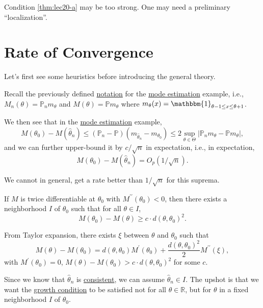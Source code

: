 \begin{remark}
	Condition \autoref{thm:lec20-a} may be too strong. One may need a preliminary ``localization''.
\end{remark}

\section{Rate of Convergence}
Let's first see some heuristics before introducing the general theory.

\begin{prev}
	Recall the previously defined \hyperref[not:M-estimation]{notation} for the \hyperref[eg:mode-estimation]{mode estimation} example, i.e., \(M_n(\theta ) = \mathbb{P} _n m_\theta \) and \(M(\theta ) = \mathbb{P} m_\theta \) where \(m_\theta (x) = \mathbbm{1}_{\theta -1 \leq x \leq \theta +1} \).
\end{prev}

We then see that in the \hyperref[eg:mode-estimation]{mode estimation} example,
\[
	M(\theta _0) - M(\hat{\theta} _n)
	\leq (\mathbb{P} _n - \mathbb{P} ) (m_{\hat{\theta } _n } - m_{\theta _0})
	\leq 2 \sup _{\theta \in \Theta } \vert \mathbb{P} _n m_\theta - \mathbb{P} m_\theta \vert,
\]
and we can further upper-bound it by \(c / \sqrt{n} \) in expectation, i.e., in expectation,
\[
	M(\theta _0) - M(\hat{\theta } _n ) = O_p(1 / \sqrt{n} ).
\]

\begin{note}
	We cannot in general, get a rate better than \(1 / \sqrt{n} \) for this suprema.
\end{note}

\begin{remark}
	If \(M\) is twice differentiable at \(\theta _0\) with \(M^{\prime\prime} (\theta _0) < 0\), then there exists a neighborhood \(I\) of \(\theta _0\) such that for all \(\theta \in I\),
	\[
		M(\theta _0) - M(\theta ) \geq c \cdot d(\theta, \theta _0)^2.
	\]
\end{remark}
\begin{explanation}
	From Taylor expansion, there exists \(\xi \) between \(\theta \) and \(\theta _0\) such that
	\[
		M(\theta ) - M(\theta _0)
		= d(\theta, \theta _0) M^{\prime} (\theta _0) + \frac{d(\theta, \theta _0)^2}{2} M^{\prime\prime} (\xi ),
	\]
	with \(M^{\prime} (\theta _0) = 0\), \(M(\theta ) - M(\theta _0) > c \cdot d(\theta, \theta _0)^2\) for some \(c\).
\end{explanation}

Since we know that \(\hat{\theta } _n \) is \hyperref[def:consistent]{consistent}, we can assume \(\hat{\theta } _n \in I\). The upshot is that we want the \hyperref[def:growth-condition]{growth condition} to be satisfied not for all \(\theta \in \mathbb{R} \), but for \(\theta \) in a fixed neighborhood \(I\) of \(\theta _0\).

